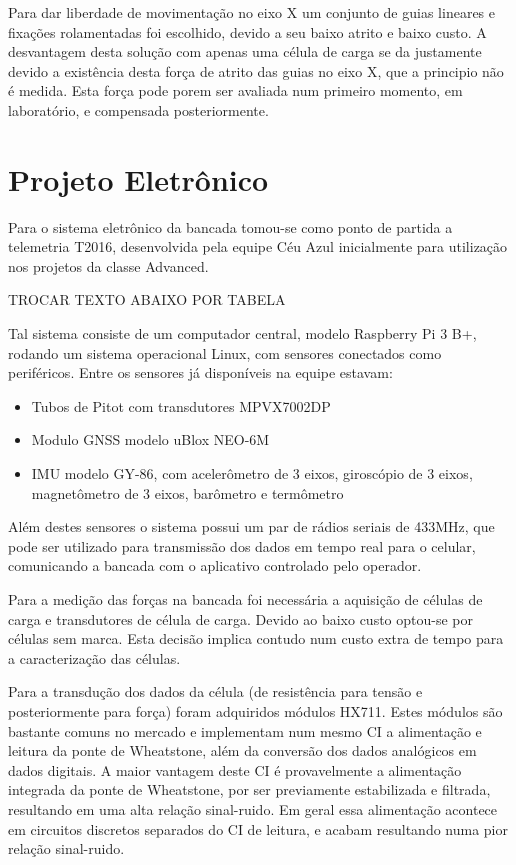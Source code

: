 Para dar liberdade de movimentação no eixo X um conjunto de guias lineares e fixações rolamentadas foi escolhido, devido a seu baixo atrito e baixo custo. A desvantagem desta solução com apenas uma célula de carga se da justamente devido a existência desta força de atrito das guias no eixo X, que a principio não é medida. Esta força pode porem ser avaliada num primeiro momento, em laboratório, e compensada posteriormente.
    
\section{Projeto Eletrônico}

Para o sistema eletrônico da bancada tomou-se como ponto de partida a telemetria T2016, desenvolvida pela equipe Céu Azul inicialmente para utilização nos projetos da classe Advanced.

TROCAR TEXTO ABAIXO POR TABELA

Tal sistema consiste de um computador central, modelo Raspberry Pi 3 B+, rodando um sistema operacional Linux, com sensores conectados como periféricos. Entre os sensores já disponíveis na equipe estavam:

\begin{itemize}
    \item Tubos de Pitot com transdutores MPVX7002DP
    \item Modulo GNSS modelo uBlox NEO-6M
    \item IMU modelo GY-86, com acelerômetro de 3 eixos, giroscópio de 3 eixos, magnetômetro de 3 eixos, barômetro e termômetro
\end{itemize}

Além destes sensores o sistema possui um par de rádios seriais de 433MHz, que pode ser utilizado para transmissão dos dados em tempo real para o celular, comunicando a bancada com o aplicativo controlado pelo operador.

Para a medição das forças na bancada foi necessária a aquisição de células de carga e transdutores de célula de carga. Devido ao baixo custo optou-se por células sem marca. Esta decisão implica contudo num custo extra de tempo para a caracterização das células.

Para a transdução dos dados da célula (de resistência para tensão e posteriormente para força) foram adquiridos módulos HX711. Estes módulos são bastante comuns no mercado e implementam num mesmo CI a alimentação e leitura da ponte de Wheatstone, além da conversão dos dados analógicos em dados digitais. A maior vantagem deste CI é provavelmente a alimentação integrada da ponte de Wheatstone, por ser previamente estabilizada e filtrada, resultando em uma alta relação sinal-ruido. Em geral essa alimentação acontece em circuitos discretos separados do CI de leitura, e acabam resultando numa pior relação sinal-ruido.

